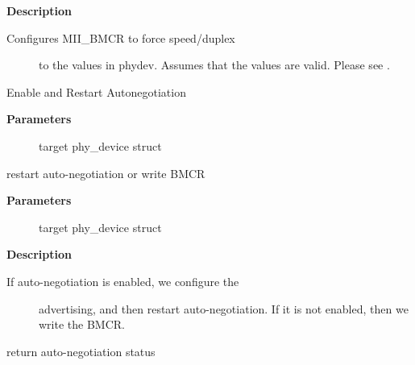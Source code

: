 \documentclass[a4paper,8pt,english]{sphinxmanual}
\begin{document}
\textbf{Description}
\begin{description}
\item[{Configures MII\_BMCR to force speed/duplex}] \leavevmode
to the values in phydev. Assumes that the values are valid.
Please see {\hyperref[networking/kapi:c.phy_sanitize_settings]{\emph{}}}.

\end{description}

\begin{fulllineitems}
\label{networking/kapi:c.genphy_restart_aneg}
Enable and Restart Autonegotiation

\end{fulllineitems}


\textbf{Parameters}
\begin{description}
\item[{}] \leavevmode
target phy\_device struct

\end{description}

\begin{fulllineitems}
\label{networking/kapi:c.genphy_config_aneg}
restart auto-negotiation or write BMCR

\end{fulllineitems}


\textbf{Parameters}
\begin{description}
\item[{}] \leavevmode
target phy\_device struct

\end{description}

\textbf{Description}
\begin{description}
\item[{If auto-negotiation is enabled, we configure the}] \leavevmode
advertising, and then restart auto-negotiation.  If it is not
enabled, then we write the BMCR.

\end{description}

\begin{fulllineitems}
\label{networking/kapi:c.genphy_aneg_done}
return auto-negotiation status

\end{fulllineitems}
\end{document}
